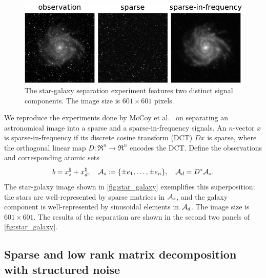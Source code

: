 \begin{figure}[t]
    \centering
   \includegraphics[width=.9\textwidth]{./figures/StarGalaxy.pdf}
    \caption{The star-galaxy separation experiment features two distinct signal components. The image size is $601\times601$ pixels.}
    \label{fig:star_galaxy}
\end{figure}

We reproduce the experiments done by McCoy et al.~\cite{mccoy2014convexity} on separating an astronomical image into a sparse and a sparse-in-frequency signals. An $n$-vector $x$ is sparse-in-frequency if its discrete cosine transform (DCT) $Dx$ is sparse, where the orthogonal linear map $D:\Re^n\to\Re^n$ encodes the DCT. Define the observations and corresponding atomic sets
\[
  b = x^{\natural}_s + x^{\natural}_d,
  \quad
  \mathcal{A}_s \coloneqq  \{\pm e_1, \dots, \pm e_n\}, \quad \mathcal{A}_d = D^*\mathcal{A}_s.
\]
The star-galaxy image shown in \autoref{fig:star_galaxy} exemplifies this superposition: the stars are well-represented by sparse matrices in $\mathcal{A}_s$, and the galaxy component is well-represented by sinusoidal elements in $\mathcal{A}_d$. The image size is $601\times601$. The results of the separation are shown in the second two panels of \autoref{fig:star_galaxy}.

\subsection{Sparse and low rank matrix decomposition with structured noise}\label{sec:3-5-3}

